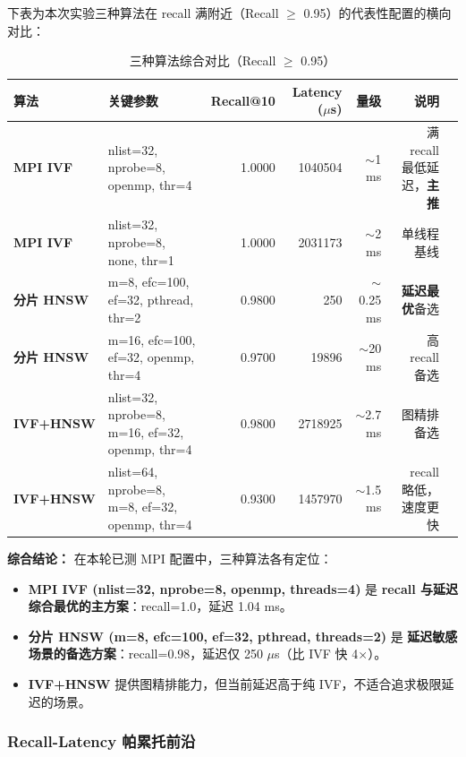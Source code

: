 \documentclass[a4paper]{article}
\begin{document}
下表为本次实验三种算法在 recall 满附近（Recall $\geq$ 0.95）的代表性配置的横向对比：

\begin{table}[H]
\centering
\small
\begin{tabular}{llrrrrl}
\toprule
算法 & 关键参数 & Recall@10 & Latency ($\mu$s) & 量级 & 说明 \\
\midrule
\textbf{MPI IVF} & nlist=32, nprobe=8, openmp, thr=4 & 1.0000 & 1040504 & $\sim$1 ms & 满 recall 最低延迟，\textbf{主推} \\
\textbf{MPI IVF} & nlist=32, nprobe=8, none, thr=1 & 1.0000 & 2031173 & $\sim$2 ms & 单线程基线 \\
\textbf{分片 HNSW} & m=8, efc=100, ef=32, pthread, thr=2 & 0.9800 & 250 & $\sim$0.25 ms & \textbf{延迟最优}备选 \\
\textbf{分片 HNSW} & m=16, efc=100, ef=32, openmp, thr=4 & 0.9700 & 19896 & $\sim$20 ms & 高 recall 备选 \\
\textbf{IVF+HNSW} & nlist=32, nprobe=8, m=16, ef=32, openmp, thr=4 & 0.9800 & 2718925 & $\sim$2.7 ms & 图精排备选 \\
\textbf{IVF+HNSW} & nlist=64, nprobe=8, m=8, ef=32, openmp, thr=4 & 0.9300 & 1457970 & $\sim$1.5 ms & recall 略低，速度更快 \\
\bottomrule
\end{tabular}
\caption{三种算法综合对比（Recall $\geq$ 0.95）}
\end{table}

\textbf{综合结论：} 在本轮已测 MPI 配置中，三种算法各有定位：

\begin{itemize}
    \item \textbf{MPI IVF (nlist=32, nprobe=8, openmp, threads=4)} 是 \textbf{recall 与延迟综合最优的主方案}：recall=1.0，延迟 1.04 ms。
    \item \textbf{分片 HNSW (m=8, efc=100, ef=32, pthread, threads=2)} 是 \textbf{延迟敏感场景的备选方案}：recall=0.98，延迟仅 250 $\mu$s（比 IVF 快 4$\times$）。
    \item \textbf{IVF+HNSW} 提供图精排能力，但当前延迟高于纯 IVF，不适合追求极限延迟的场景。
\end{itemize}

\subsubsection{Recall-Latency 帕累托前沿}
\end{document}
